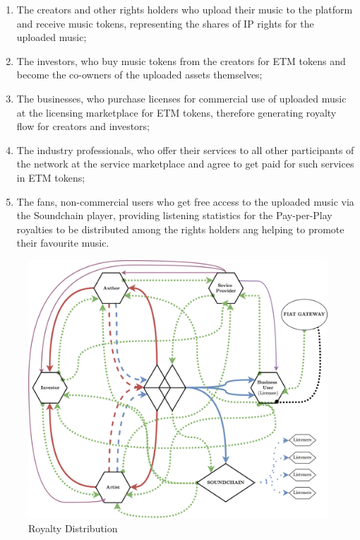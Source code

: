 \documentclass[12pt]{report}
\begin{document}
\begin{enumerate}
	\item The creators and other rights holders who upload their music to the platform and receive music tokens, representing the shares of IP rights for the uploaded music;
	\item The investors, who buy music tokens from the creators for ETM tokens and become the co-owners of the uploaded assets themselves;
	\item The businesses, who purchase licenses for commercial use of uploaded music at the licensing marketplace for ETM tokens, therefore generating royalty flow for creators and investors;
	\item The industry professionals, who offer their services to all other participants of the network at the service marketplace and agree to get paid for such services in ETM tokens;
	\item The fans, non-commercial users who get free access to the uploaded music via the Soundchain player, providing listening statistics for the Pay-per-Play royalties to be distributed among the rights holders ang helping to promote their favourite music.
\end{enumerate}

\begin{figure}[H] 
\centering
\caption{Royalty Distribution}
\vspace{20pt}
\includegraphics[width=\textwidth]{musereum-scheme}
\end{figure}
\end{document}
